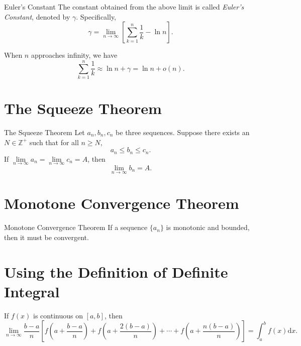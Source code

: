 \begin{definition}{Euler's Constant}{}
  The constant obtained from the above limit is called \emph{Euler's Constant},
  denoted by $\gamma$. Specifically,
  \begin{equation}
    \gamma = \lim \limits _{n \rightarrow \infty} \left[ \sum\limits_{k = 1}^n \frac{1}{k} - \ln n \right].
  \end{equation}
\end{definition}

\begin{corollary}{}{}
  When $n$ approaches infinity, we have
  \begin{equation}
    \sum\limits_{k = 1}^n \frac{1}{k} \approx \ln n + \gamma = \ln n + o(n).
  \end{equation}
\end{corollary}

\section{The Squeeze Theorem}

\begin{theorem}{The Squeeze Theorem}{}
  Let $a_n, b_n, c_n$ be three sequences.
  Suppose there exists an $N \in \mathbb{Z}^+$ such that for all $n \geq N$,
  \begin{equation}
    a_n \leq b_n \leq c_n.
  \end{equation}
  If $\lim \limits _{n \rightarrow \infty} a_n = \lim \limits _{n \rightarrow
    \infty} c_n = A$,
  then 
  \begin{equation}
    \lim \limits _{n \rightarrow \infty} b_n = A.
  \end{equation}
\end{theorem}

\section{Monotone Convergence Theorem}

\begin{theorem}{Monotone Convergence Theorem}{}
  If a sequence $\{a_n\}$ is monotonic and bounded,
  then it must be convergent.
\end{theorem}

\section{Using the Definition of Definite Integral}

\begin{proposition}{}{}
  If $f(x)$ is continuous on $[a,b]$, then
  \begin{equation}
    \lim \limits _{n \rightarrow \infty} \frac{b - a}{n} \left[
      f(a + \frac{b - a}{n}) + f( a + \frac{2(b-a)}{n}) + \cdots + f(a + \frac{n(b-a)}{n})
    \right] = \int_a^b f(x) \mathrm{d} x.
  \end{equation}
\end{proposition}



